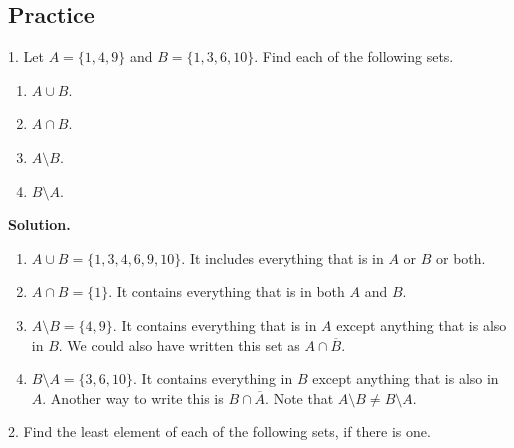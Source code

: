\documentclass[12pt,]{book}
\theoremstyle{plain}
\theoremstyle{definition}
\theoremstyle{definition}
\theoremstyle{definition}
\numberwithin{equation}{chapter}
\renewcommand{\bar}{\overline}
\begin{document}
\subsection[{Practice}]{Practice}\label{practice_intro-sets}
\begin{exerciselist}
\item[1.]\hypertarget{exercise-66}{}\noindent%
\hypertarget{p-607}{}%
Let \(A = \{1, 4, 9\}\) and \(B = \{1, 3, 6, 10\}\).  Find each of the following sets.%
\hypertarget{p-608}{}%
\leavevmode%
\begin{enumerate}[label=(\alph*)]
\item\hypertarget{li-277}{}\hypertarget{p-609}{}%
\(A \cup B\).   \framebox[15em]{\raisebox{1ex}{}}%
\item\hypertarget{li-278}{}\hypertarget{p-610}{}%
\(A \cap B\).  \framebox[15em]{\raisebox{1ex}{}}%
\item\hypertarget{li-279}{}\hypertarget{p-611}{}%
\(A \setminus B\).  \framebox[15em]{\raisebox{1ex}{}}%
\item\hypertarget{li-280}{}\hypertarget{p-612}{}%
\(B \setminus A\).  \framebox[15em]{\raisebox{1ex}{}}%
\end{enumerate}
%
\par
\medskip\noindent%
\textbf{Solution.}\quad \hypertarget{p-613}{}%
\leavevmode%
\begin{enumerate}[label=(\alph*)]
\item\hypertarget{li-281}{}\hypertarget{p-614}{}%
\(A \cup B = \{1,3,4,6,9,10\}\).  It includes everything that is in \(A\) or \(B\) or both.%
\item\hypertarget{li-282}{}\hypertarget{p-615}{}%
\(A \cap B = \{1\}\).  It contains everything that is in both \(A\) and \(B\).%
\item\hypertarget{li-283}{}\hypertarget{p-616}{}%
\(A \setminus B = \{4, 9\}\).  It contains everything that is in \(A\) except anything that is also in \(B\).  We could also have written this set as \(A \cap \bar{B}\).%
\item\hypertarget{li-284}{}\hypertarget{p-617}{}%
\(B \setminus A = \{3, 6, 10\}\). It contains everything in \(B\) except anything that is also in \(A\).  Another way to write this is \(B \cap \bar{A}\).  Note that \(A \setminus B \ne B \setminus A\).%
\end{enumerate}
%
\par
\item[2.]\hypertarget{exercise-67}{}\noindent%
\hypertarget{p-618}{}%
Find the least element of each of the following sets, if there is one.%

\end{exerciselist}
\end{document}
